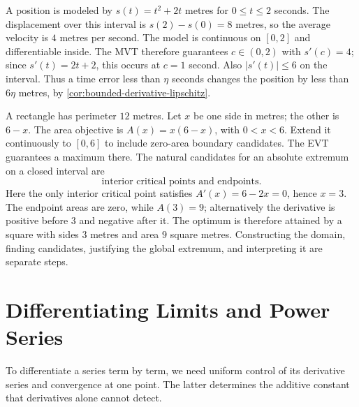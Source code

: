 \begin{example}
A position is modeled by $s(t)=t^2+2t$ metres for $0\leq t\leq2$
seconds. The displacement over this interval is $s(2)-s(0)=8$ metres,
so the average velocity is $4$ metres per second.
The model is continuous on $[0,2]$ and differentiable inside.
The MVT therefore guarantees $c\in(0,2)$ with $s'(c)=4$;
since $s'(t)=2t+2$, this occurs at $c=1$ second.
Also $|s'(t)|\leq6$ on the interval. Thus a time error less than
$\eta$ seconds changes the position by less than $6\eta$ metres,
by \cref{cor:bounded-derivative-lipschitz}.
\end{example}

\begin{example}
A rectangle has perimeter $12$ metres. Let $x$ be one side in metres;
the other is $6-x$. The area objective is $A(x)=x(6-x)$, with
$0<x<6$. Extend it continuously to $[0,6]$ to include zero-area
boundary candidates. The EVT guarantees a maximum there. The natural
candidates for an absolute extremum on a closed interval are
\[
\boxed{\text{interior critical points and endpoints}.}
\]
Here the only interior critical point satisfies $A'(x)=6-2x=0$, hence
$x=3$.
The endpoint areas are zero, while $A(3)=9$; alternatively the
derivative is positive before $3$ and negative after it. The optimum
is therefore attained by a square with sides $3$ metres and area
$9$ square metres. Constructing the domain, finding candidates,
justifying the global extremum, and interpreting it are separate steps.
\end{example}

\section{Differentiating Limits and Power Series}

To differentiate a series term by term, we need uniform control of its
derivative series and convergence at one point. The latter determines the
additive constant that derivatives alone cannot detect.

